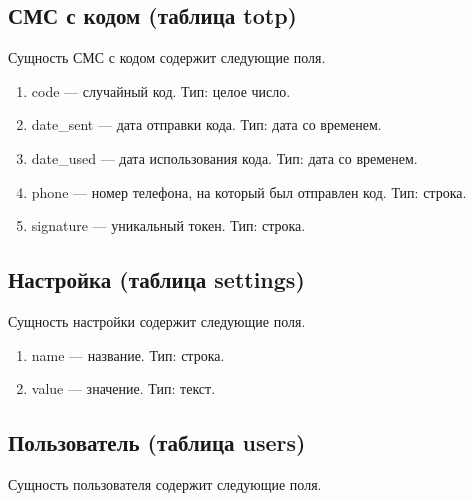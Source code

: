 \subsection{СМС с кодом (таблица totp)}

Сущность СМС с кодом содержит следующие поля.

\begin{enumerate}
	\item code --- случайный код. Тип: целое число.
	\item date\_sent --- дата отправки кода. Тип: дата со временем.
	\item date\_used --- дата использования кода. Тип: дата со временем.
	\item phone --- номер телефона, на который был отправлен код. Тип: строка.
	\item signature --- уникальный токен. Тип: строка.
\end{enumerate}

\subsection{Настройка (таблица settings)}

Сущность настройки содержит следующие поля.

\begin{enumerate}
	\item name --- название. Тип: строка.
	\item value --- значение. Тип: текст.
\end{enumerate}

\subsection{Пользователь (таблица users)}

Сущность пользователя содержит следующие поля.

